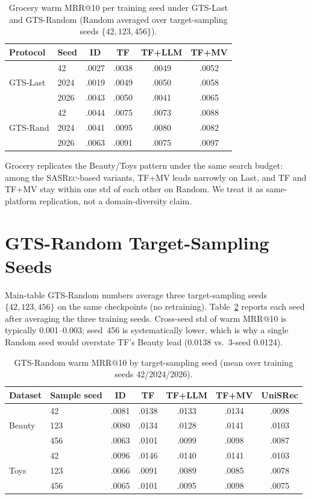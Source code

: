 \documentclass[sigconf,natbib=true,anonymous]{acmart}
\newcommand{\tfmv}{\textsc{TF+MV}\xspace}
\newcommand{\base}{\textsc{SASRec}\xspace}
\begin{document}
\begin{table}[h]
\centering
\caption{Grocery warm MRR@10 per training seed under GTS-Last and GTS-Random (Random averaged over target-sampling seeds $\{42,123,456\}$).}
\label{tab:grocery-perseed}
\small
\setlength{\tabcolsep}{3pt}
\begin{tabular}{@{}llcccc@{}}
\toprule
Protocol & Seed & ID & TF & TF+LLM & TF+MV \\
\midrule
\multirow{3}{*}{GTS-Last}
 & 42    & .0027 & .0038 & .0049 & .0052 \\
 & 2024  & .0019 & .0049 & .0050 & .0058 \\
 & 2026  & .0043 & .0050 & .0041 & .0065 \\
\midrule
\multirow{3}{*}{GTS-Rand}
 & 42    & .0044 & .0075 & .0073 & .0088 \\
 & 2024  & .0041 & .0095 & .0080 & .0082 \\
 & 2026  & .0063 & .0091 & .0075 & .0097 \\
\bottomrule
\end{tabular}
\end{table}

Grocery replicates the Beauty/Toys pattern under the same search budget: among the \base-based variants, \tfmv leads narrowly on Last, and TF and \tfmv stay within one std of each other on Random.
We treat it as same-platform replication, not a domain-diversity claim.

\section{GTS-Random Target-Sampling Seeds}
\label{app:random-seeds}

Main-table GTS-Random numbers average three target-sampling seeds $\{42,123,456\}$ on the same checkpoints (no retraining).
Table~\ref{tab:random-seeds} reports each seed after averaging the three training seeds.
Cross-seed std of warm MRR@10 is typically 0.001--0.003; seed~456 is systematically lower, which is why a single Random seed would overstate TF's Beauty lead (0.0138 vs.\ 3-seed 0.0124).

\begin{table}[h]
\centering
\caption{GTS-Random warm MRR@10 by target-sampling seed (mean over training seeds 42/2024/2026).}
\label{tab:random-seeds}
\small
\setlength{\tabcolsep}{3pt}
\begin{tabular}{@{}llccccc@{}}
\toprule
Dataset & Sample seed & ID & TF & TF+LLM & TF+MV & UniSRec \\
\midrule
\multirow{3}{*}{Beauty}
 & 42    & .0081 & .0138 & .0133 & .0134 & .0098 \\
 & 123   & .0080 & .0134 & .0128 & .0141 & .0103 \\
 & 456   & .0063 & .0101 & .0099 & .0098 & .0087 \\
\midrule
\multirow{3}{*}{Toys}
 & 42    & .0096 & .0146 & .0140 & .0141 & .0103 \\
 & 123   & .0066 & .0091 & .0089 & .0085 & .0078 \\
 & 456   & .0065 & .0101 & .0095 & .0098 & .0075 \\
\bottomrule
\end{tabular}
\end{table}
\end{document}
